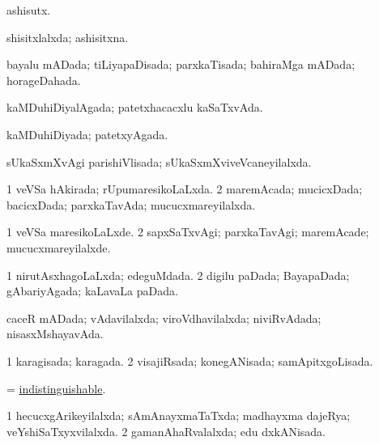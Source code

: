 \bentry
{} 
\gl{\nA}
\expl{}
\bmng
 ashisutx.\eng{ } 
\emng
\eentry

\bentry
{} 
\gl{\gu}
\expl{}
\bmng
 shisitxlalxda; ashisitxna. 
\emng
\eentry

\bentry
{} 
\gl{\gu}
\expl{}
\bmng
 bayalu mADada; tiLiyapaDisada; parxkaTisada; bahiraMga mADada; horageDahada. 
\emng
\eentry

\bentry
{} 
\gl{\gu}
\expl{}
\bmng
 kaMDuhiDiyalAgada; patetxhacacxlu kaSaTxvAda. 
\emng
\eentry

\bentry
{} 
\gl{\gu}
\expl{}
\bmng
 kaMDuhiDiyada; patetxyAgada. 
\emng
\eentry

\bentry
{} 
\gl{\gu}
\expl{}
\bmng
 sUkaSxmXvAgi parishiVlisada; sUkaSxmXviveVcaneyilalxda. 
\emng
\eentry

\bentry
{} 
\gl{\gu}
\expl{}
\bmng
\bnum
\num{1} veVSa hAkirada; rUpumaresikoLaLxda. 
\num{2} maremAcada; mucicxDada; bacicxDada; parxkaTavAda; mucucxmareyilalxda. 
\enum
\emng
\eentry

\bentry
{} 
\gl{\kirxvi}
\expl{}
\bmng
\bnum
\num{1} veVSa maresikoLaLxde. 
\num{2} sapxSaTxvAgi; parxkaTavAgi; maremAcade; mucucxmareyilalxde. 
\enum
\emng
\eentry

\bentry
{} 
\gl{\gu}
\expl{}
\bmng
\bnum
\num{1} nirutAsxhagoLaLxda; edeguMdada. 
\num{2} digilu paDada; BayapaDada; gAbariyAgada; kaLavaLa paDada. 
\enum
\emng
\eentry

\bentry
{} 
\gl{\gu}
\expl{}
\bmng
 caceR mADada; vAdavilalxda; viroVdhavilalxda; niviRvAdada; nisasxMshayavAda. 
\emng
\eentry

\bentry
{} 
\gl{\gu}
\expl{}
\bmng
\bnum
\num{1} karagisada; karagada. 
\num{2} visajiRsada; konegANisada; samApitxgoLisada. 
\enum
\emng
\eentry

\bentry
{} 
\gl{\gu}
\expl{}
\bmng
 = \hyperref{kandict_i.pdf}{I}{indistinguishable}{indistinguishable}. 
\emng
\eentry

\bentry
{} 
\gl{\gu}
\expl{}
\bmng
\bnum
\num{1} hecucxgArikeyilalxda; sAmAnayxmaTaTxda; madhayxma dajeRya; veYshiSaTxyxvilalxda. 
\num{2} gamanAhaRvalalxda; edu dxkANisada. 
\enum
\emng
\eentry

